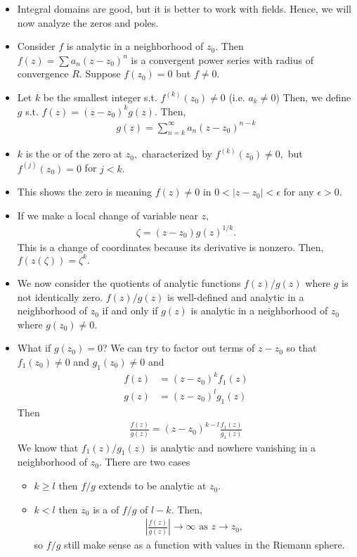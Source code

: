 \documentclass[a4paper,12pt]{article}
\begin{document}
\begin{itemize}
    \item Integral domains are good, but it is better to work with fields. Hence, we will now analyze the zeros and poles.
    \item Consider $f$ is analytic in a neighborhood of $z_0.$ Then $f(z)=\sum a_n(z-z_0)^n$ is a convergent power series with radius of convergence $R.$ Suppose $f(z_0)=0$ but $f\neq0.$
    \item Let $k$ be the smallest integer s.t. $f^{(k)}(z_0)\neq0$ (i.e. $a_k\neq0$) Then, we define $g$ s.t. $f(z)=(z-z_0)^kg(z).$ Then, \begin{align}
        g(z)=\sum_{n=k}^\infty a_n(z-z_0)^{n-k}
    \end{align}
    \item $k$ is the  or  of the zero at $z_0,$ characterized by $f^{(k)}(z_0)\neq0,$ but $f^{(j)}(z_0)=0$ for $j<k.$
    \item This shows the zero is  meaning $f(z)\neq0$ in $0<|z-z_0|<\epsilon$ for any $\epsilon>0.$
    \item If we make a local change of variable near $z,$\begin{align}
        \zeta=(z-z_0)g(z)^{1/k}.
    \end{align}
    This is a change of coordinates because its derivative is nonzero. Then, $f(z(\zeta))=\zeta^k.$
    \item We now consider the quotients of analytic functions $f(z)/g(z)$ where $g$ is not identically zero. $f(z)/g(z)$ is well-defined and analytic in a neighborhood of $z_0$ if and only if $g(z)$ is analytic in a neighborhood of $z_0$ where $g(z_0)\neq0.$
    \item What if $g(z_0)=0$? We can try to factor out terms of $z-z_0$ so that $f_1(z_0)\neq0$ and $g_1(z_0)\neq0$ and\begin{align}
        f(z)&=(z-z_0)^k f_1(z)\\
        g(z)&=(z-z_0)^l g_1(z)
    \end{align}
    Then \begin{align}
        \frac{f(z)}{g(z)}=(z-z_0)^{k-l}\frac{f_1(z)}{g_1(z)}
    \end{align}
    We know that $f_1(z)/g_1(z)$ is analytic and nowhere vanishing in a neighborhood of $z_0.$ There are two cases \begin{itemize}
        \item $k\geq l$ then $f/g$ extends to be analytic at $z_0.$
        \item $k<l$ then $z_0$ is a  of $f/g$ of  $l-k.$ Then, \begin{align}
            \left|\frac{f(z)}{g(z)}\right|\to\infty\text{ as }z\to z_0,
        \end{align}
        so $f/g$ still make sense as a function with values in the Riemann sphere.
    \end{itemize} 
\end{itemize}
\end{document}
